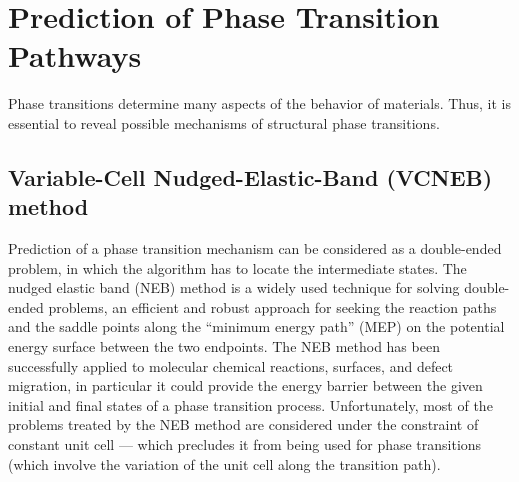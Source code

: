 \documentclass[12pt]{article}
\begin{document}
\newpage
\section{Prediction of Phase Transition Pathways}

Phase transitions determine many aspects of the behavior of materials. Thus, it
is essential to reveal possible mechanisms of structural phase transitions.


\subsection{Variable-Cell Nudged-Elastic-Band (VCNEB) method} \label{vcneb}

Prediction of a phase transition mechanism can be considered as a double-ended
problem, in which the algorithm has to locate the intermediate states. The
nudged elastic band (NEB) \cite{Mills1995, Henkelman2000a, Henkelman2000b}
method is a widely used technique for solving double-ended problems, an
efficient and robust approach for seeking the reaction paths and the saddle
points along the ``minimum energy path'' (MEP) on the potential energy surface
between the two endpoints. The NEB method has been successfully applied to
molecular chemical reactions, surfaces, and defect migration, in particular it
could provide the energy barrier between the given initial and final states of a
phase transition process. Unfortunately, most of the problems treated by the NEB
method are considered under the constraint of constant unit cell --- which
precludes it from being used for phase transitions (which involve the variation
of the unit cell along the transition path).
\end{document}
